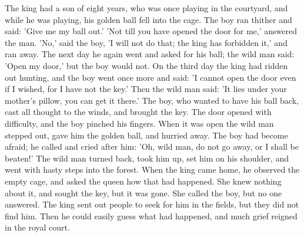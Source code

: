 \documentclass[12pt]{book}
\begin{document}
The king had a son of eight years, who was once playing in the
courtyard, and while he was playing, his golden ball fell into the
cage. The boy ran thither and said: 'Give me my ball out.' 'Not till
you have opened the door for me,' answered the man. 'No,' said the
boy, 'I will not do that; the king has forbidden it,' and ran away.
The next day he again went and asked for his ball; the wild man said:
'Open my door,' but the boy would not. On the third day the king had
ridden out hunting, and the boy went once more and said: 'I cannot
open the door even if I wished, for I have not the key.' Then the wild
man said: 'It lies under your mother's pillow, you can get it there.'
The boy, who wanted to have his ball back, cast all thought to the
winds, and brought the key. The door opened with difficulty, and the
boy pinched his fingers. When it was open the wild man stepped out,
gave him the golden ball, and hurried away. The boy had become afraid;
he called and cried after him: 'Oh, wild man, do not go away, or I
shall be beaten!' The wild man turned back, took him up, set him on
his shoulder, and went with hasty steps into the forest. When the king
came home, he observed the empty cage, and asked the queen how that
had happened. She knew nothing about it, and sought the key, but it
was gone. She called the boy, but no one answered. The king sent out
people to seek for him in the fields, but they did not find him. Then
he could easily guess what had happened, and much grief reigned in the
royal court.
\end{document}
